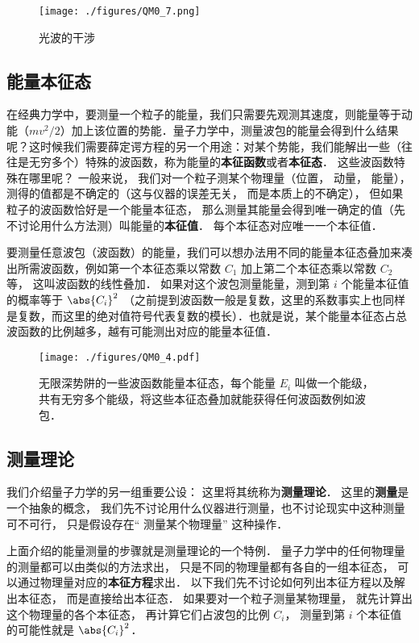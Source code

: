 \begin{figure}[ht]
\centering
\texttt{[image: ./figures/QM0\_7.png]}
\caption{光波的干涉} \label{QM0_fig7}
\end{figure}


\subsection{能量本征态}
在经典力学中，要测量一个粒子的能量，我们只需要先观测其速度，则能量等于动能（$mv^2/2$）加上该位置的势能．量子力学中，测量波包的能量会得到什么结果呢？这时候我们需要薛定谔方程的另一个用途：对某个势能，我们能解出一些（往往是无穷多个）特殊的波函数，称为能量的\textbf{本征函数}或者\textbf{本征态}． 这些波函数特殊在哪里呢？ 一般来说， 我们对一个粒子测某个物理量（位置， 动量， 能量）， 测得的值都是不确定的（这与仪器的误差无关， 而是本质上的不确定）， 但如果粒子的波函数恰好是一个能量本征态， 那么测量其能量会得到唯一确定的值（先不讨论用什么方法测）叫能量的\textbf{本征值}． 每个本征态对应唯一一个本征值．

要测量任意波包（波函数）的能量，我们可以想办法用不同的能量本征态叠加来凑出所需波函数，例如第一个本征态乘以常数 $C_1$ 加上第二个本征态乘以常数 $C_2$ 等， 这叫波函数的线性叠加． 如果对这个波包测量能量，测到第 $i$ 个能量本征值的概率等于 $\abs{C_i}^2$ （之前提到波函数一般是复数，这里的系数事实上也同样是复数，而这里的绝对值符号代表复数的模长）．也就是说，某个能量本征态占总波函数的比例越多，越有可能测出对应的能量本征值．


\begin{figure}[ht]
\centering
\texttt{[image: ./figures/QM0\_4.pdf]}
\caption{无限深势阱的一些波函数能量本征态，每个能量 $E_i$ 叫做一个能级，共有无穷多个能级，将这些本征态叠加就能获得任何波函数例如波包．} \label{QM0_fig4}
\end{figure}


\subsection{测量理论}
我们介绍量子力学的另一组重要公设： 这里将其统称为\textbf{测量理论}． 这里的\textbf{测量}是一个抽象的概念， 我们先不讨论用什么仪器进行测量，也不讨论现实中这种测量可不可行， 只是假设存在“ 测量某个物理量” 这种操作．

上面介绍的能量测量的步骤就是测量理论的一个特例． 量子力学中的任何物理量的测量都可以由类似的方法求出， 只是不同的物理量都有各自的一组本征态， 可以通过物理量对应的\textbf{本征方程}求出． 以下我们先不讨论如何列出本征方程以及解出本征态， 而是直接给出本征态． 如果要对一个粒子测量某物理量， 就先计算出这个物理量的各个本征态， 再计算它们占波包的比例 $C_i$， 测量到第 $i$ 个本征值的可能性就是 $\abs{C_i}^2$．

